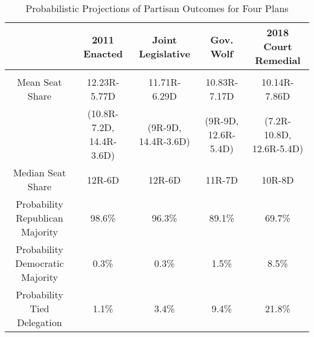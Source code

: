 %
\begin{table}[!htbp] \centering 
  \caption{Probabilistic Projections of Partisan Outcomes for Four Plans} 
  \label{tab:prob} 
\begin{tabular}{@{\extracolsep{-5pt}} ccccc} 
 & 2011 Enacted & Joint Legislative & Gov. Wolf & 2018 Court Remedial \\ 
\hline \\[-1.8ex] 
Mean Seat Share & 12.23R-5.77D & 11.71R-6.29D & 10.83R-7.17D & 10.14R-7.86D \\ 
 & (10.8R-7.2D, 14.4R-3.6D) & (9R-9D, 14.4R-3.6D) & (9R-9D, 12.6R-5.4D) & (7.2R-10.8D, 12.6R-5.4D) \\ 
Median Seat Share & 12R-6D & 12R-6D & 11R-7D & 10R-8D \\ 
Probability Republican Majority & 98.6\% & 96.3\% & 89.1\% & 69.7\% \\ 
Probability Democratic Majority & 0.3\% & 0.3\% & 1.5\% & 8.5\% \\ 
Probability Tied Delegation & 1.1\% & 3.4\% & 9.4\% & 21.8\% \\ 
\end{tabular}
\end{table} 
%
